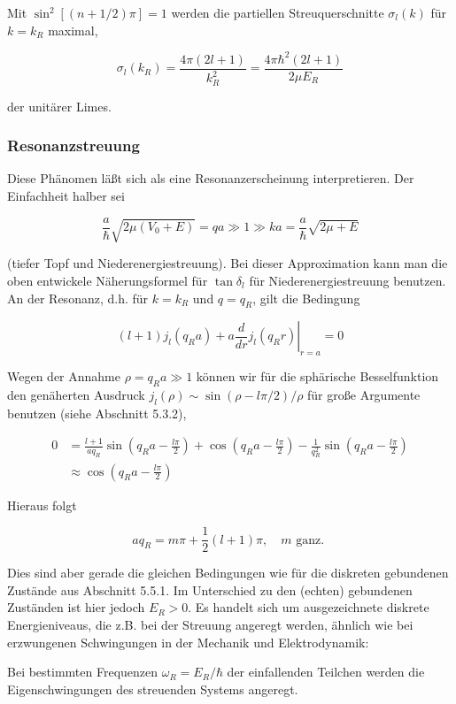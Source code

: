 \documentclass[10pt, letterpaper]{article}
\begin{document}
Mit $\sin ^{2}[(n+1 / 2) \pi]=1$ werden die partiellen Streuquerschnitte $\sigma_{l}(k)$ für $k=k_{R}$ maximal,

$$
\sigma_{l}\left(k_{R}\right)=\frac{4 \pi(2 l+1)}{k_{R}^{2}}=\frac{4 \pi \hbar^{2}(2 l+1)}{2 \mu E_{R}}
$$

der unitärer Limes.

\subsubsection*{Resonanzstreuung}
Diese Phänomen läßt sich als eine Resonanzerscheinung interpretieren. Der Einfachheit halber sei

$$
\frac{a}{\hbar} \sqrt{2 \mu\left(V_{0}+E\right)}=q a \gg 1 \gg k a=\frac{a}{\hbar} \sqrt{2 \mu+E}
$$

(tiefer Topf und Niederenergiestreuung). Bei dieser Approximation kann man die oben entwickele Näherungsformel für $\tan \delta_{l}$ für Niederenergiestreuung benutzen. An der Resonanz, d.h. für $k=k_{R}$ und $q=q_{R}$, gilt die Bedingung

$$
(l+1) j_{l}\left(q_{R} a\right)+\left.a \frac{d}{d r} j_{l}\left(q_{R} r\right)\right|_{r=a}=0
$$

Wegen der Annahme $\rho=q_{R} a \gg 1$ können wir für die sphärische Besselfunktion den genäherten Ausdruck $j_{l}(\rho) \sim \sin (\rho-l \pi / 2) / \rho$ für große Argumente benutzen (siehe Abschnitt 5.3.2),

$$
\begin{aligned}
0 & =\frac{l+1}{a q_{R}} \sin \left(q_{R} a-\frac{l \pi}{2}\right)+\cos \left(q_{R} a-\frac{l \pi}{2}\right)-\frac{1}{q_{R}^{2}} \sin \left(q_{R} a-\frac{l \pi}{2}\right) \\
& \approx \cos \left(q_{R} a-\frac{l \pi}{2}\right)
\end{aligned}
$$

Hieraus folgt

$$
a q_{R}=m \pi+\frac{1}{2}(l+1) \pi, \quad m \text { ganz. }
$$

Dies sind aber gerade die gleichen Bedingungen wie für die diskreten gebundenen Zustände aus Abschnitt 5.5.1. Im Unterschied zu den (echten) gebundenen Zuständen ist hier jedoch $E_{R}>0$. Es handelt sich um ausgezeichnete diskrete Energieniveaus, die z.B. bei der Streuung angeregt werden, ähnlich wie bei erzwungenen Schwingungen in der Mechanik und Elektrodynamik:

Bei bestimmten Frequenzen $\omega_{R}=E_{R} / \hbar$ der einfallenden Teilchen werden die Eigenschwingungen des streuenden Systems angeregt.
\end{document}
